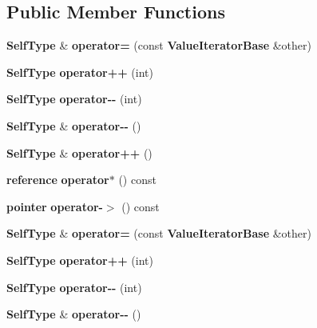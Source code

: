 \subsection*{Public Member Functions}
\begin{DoxyCompactItemize}
\item 
{\bf Self\+Type} \& {\bfseries operator=} (const {\bf Value\+Iterator\+Base} \&other)\label{class_json_1_1_value_const_iterator_ad1b1c11f8d7fb22d4d3c231915f2b15b}

\item 
{\bf Self\+Type} {\bfseries operator++} (int)\label{class_json_1_1_value_const_iterator_ab3f0c2edbfc8f7d60645f3d597d05e28}

\item 
{\bf Self\+Type} {\bfseries operator-\/-\/} (int)\label{class_json_1_1_value_const_iterator_a94935961e9331c6f7b907b05ec8df75e}

\item 
{\bf Self\+Type} \& {\bfseries operator-\/-\/} ()\label{class_json_1_1_value_const_iterator_a31415e44e44e56fb2bfda7e8bb784646}

\item 
{\bf Self\+Type} \& {\bfseries operator++} ()\label{class_json_1_1_value_const_iterator_a2cfe2f7a94a688186efdafb1b181c319}

\item 
{\bf reference} {\bfseries operator$\ast$} () const \label{class_json_1_1_value_const_iterator_aeb44153d71c61ac9397a84d5ecc244c5}

\item 
{\bf pointer} {\bfseries operator-\/$>$} () const \label{class_json_1_1_value_const_iterator_ac493d31c8eede8af10b71415fe8e624b}

\item 
{\bf Self\+Type} \& {\bfseries operator=} (const {\bf Value\+Iterator\+Base} \&other)\label{class_json_1_1_value_const_iterator_afca9f2ee621a4a47f3e61d6144ce3d0c}

\item 
{\bf Self\+Type} {\bfseries operator++} (int)\label{class_json_1_1_value_const_iterator_ab3f0c2edbfc8f7d60645f3d597d05e28}

\item 
{\bf Self\+Type} {\bfseries operator-\/-\/} (int)\label{class_json_1_1_value_const_iterator_a94935961e9331c6f7b907b05ec8df75e}

\item 
{\bf Self\+Type} \& {\bfseries operator-\/-\/} ()\label{class_json_1_1_value_const_iterator_a31415e44e44e56fb2bfda7e8bb784646}


\end{DoxyCompactItemize}
